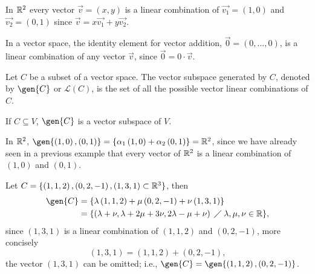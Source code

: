 \begin{example}
    In $\mathbb{R}^2$ every vector $\vec{v} = \left(x, y\right)$ is a linear combination of $\vec{v_1} =
    \left( 1, 0 \right) $ and $\vec{v_2} = \left( 0, 1 \right) $ since $\vec{v} = x\vec{v_1} + y\vec{v_2}$.
\end{example}

\begin{prop}
    In a vector space, the identity element for vector addition, $\vec{0} = \left( 0, \ldots, 0 \right) $, is
    a linear combination of any vector $\vec{v}$, since $\vec{0} = 0\cdot\vec{v}$.
\end{prop}

\begin{defi}
    Let $C$ be a subset of a vector space. The vector subspace generated by $C$, denoted by $\gen{C}$ or
    $\mathcal{L}\left( C \right) $, is the set of all the possible vector linear combinations of $C$.
\end{defi}

\begin{prop}
    If $C\subseteq V$, $\gen{C}$ is a vector subspace of $V$.
\end{prop}

\begin{example}
    In $\mathbb{R}^2$, $\gen{\left( 1, 0 \right) , \left( 0, 1 \right) } = \{\alpha_1\left( 1, 0 \right) +
    \alpha_2\left( 0, 1 \right) \} = \R^2 $, since we have already seen in a previous example that every
    vector of $\mathbb{R}^2$ is a linear combination of $\left( 1, 0 \right) $ and $\left( 0, 1 \right) $.
\end{example}

\begin{example}
    Let $C = \{\left( 1, 1, 2 \right), \left( 0, 2, -1 \right), \left( 1, 3, 1 \right) \subset\mathbb{R}^3\} $, then
    \begin{align}
        \gen{C} &= \{\lambda\left( 1, 1, 2 \right) + \mu\left( 0, 2, -1 \right) + \nu\left( 1, 3, 1 \right)\}
             \\ &= \{\left( \lambda + \nu, \lambda + 2\mu + 3\nu, 2\lambda - \mu + \nu \right) \st\lambda,
              \mu, \nu\in\R\},
    \end{align}
    since $\left( 1, 3, 1 \right) $ is a linear combination of $\left( 1, 1, 2 \right) $ and $\left( 0, 2, -1
    \right) $, more concisely
    \begin{equation}
        \left( 1, 3, 1 \right) = \left( 1, 1, 2 \right) + \left( 0, 2, -1 \right),
    \end{equation}
    the vector $\left( 1, 3, 1 \right) $ can be omitted; i.e., $\gen{C} = \gen{\left( 1, 1, 2 \right), \left(
    0, 2, -1\right) }$.
\end{example}

